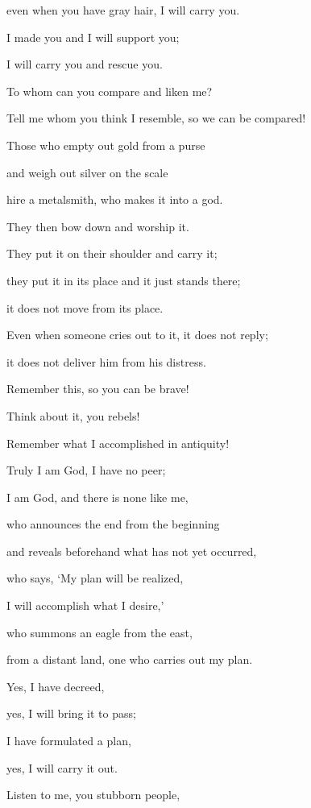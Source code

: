 {\par }{\Q even
when you have gray hair,
I
will carry
you.
\par }{\Q I
made
you and I
will support
you;
\par }{\Q I
will carry
you and rescue you.
\par }{\Q {}To whom
can you compare
and liken
me?
\par }{\Q Tell me whom you think I resemble,
so we can be compared!
\par }{\Q {}Those who empty
out gold
from a purse
\par }{\Q and weigh
out silver
on the scale

\par }{\Q hire
a metalsmith,
who makes it into a
god.
\par }{\Q They then bow down and worship it.
\par }{\Q {}They put
it on
their shoulder
and carry
it;
\par }{\Q they put
it in its place
and it just stands
there;
\par }{\Q it does not
move
from its place.
\par }{\Q Even
when someone cries out
to
it, it does not
reply;
\par }{\Q it does not
deliver
him from his distress.
\par }{\Q {}Remember
this,
so you can be brave!

\par }{\Q Think about it, you rebels!
\par }{\Q {}Remember
what I accomplished
in antiquity!

\par }{\Q Truly I am
God,
I have no peer;
\par }{\Q I am God,
and there is none
like me,
\par }{\Q {}who announces
the end
from
the beginning
\par }{\Q and reveals beforehand
what
has not
yet occurred,
\par }{\Q who says,
‘My plan
will be realized,
\par }{\Q I will accomplish
what I desire,’
\par }{\Q {}who summons
an eagle
from the east,
\par }{\Q from a distant
land,
one
who carries out
my plan.
\par }{\Q Yes,
I have decreed,
\par }{\Q yes,
I will bring
it to pass;
\par }{\Q I have formulated a plan,
\par }{\Q yes,
I will carry it out.
\par }{\Q {}Listen
to
me, you stubborn
people,

}

